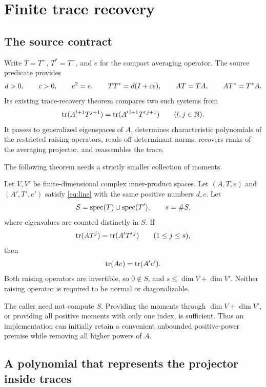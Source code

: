 \section{Finite trace recovery}\label{sec:trace}

\subsection{The source contract}

Write \(T=T^+\), \(T^*=T^-\), and \(e\) for the compact averaging operator.
The source predicate  provides
\begin{equation}\label{eq:line}
 d>0,\qquad c>0,\qquad e^2=e,\qquad
 TT^*=d(I+ce),\qquad AT=TA,\qquad AT^*=T^*A.
\end{equation}
Its existing trace-recovery theorem compares two such systems from
\[
 \operatorname{tr}(A^{l+1}T^{j+1})=\operatorname{tr}(A'^{\,l+1}T'^{\,j+1})
 \qquad(l,j\in\mathbb N).
\]
It passes to generalized eigenspaces of \(A\), determines characteristic polynomials
of the restricted raising operators, reads off determinant norms, recovers ranks of
the averaging projector, and reassembles the trace.

The following theorem needs a strictly smaller collection of moments.

\begin{theorem}\label{thm:finite-trace}
Let \(V,V'\) be finite-dimensional complex inner-product spaces. Let
\((A,T,e)\) and \((A',T',e')\) satisfy \eqref{eq:line} with the same positive
numbers \(d,c\). Let
\[
 S=\operatorname{spec}(T)\cup\operatorname{spec}(T'),\qquad s=\#S,
\]
where eigenvalues are counted distinctly in \(S\). If
\begin{equation}\label{eq:finite-moments}
 \operatorname{tr}(AT^j)=\operatorname{tr}(A'T'^{\,j})\qquad(1\leq j\leq s),
\end{equation}
then
\[
 \operatorname{tr}(Ae)=\operatorname{tr}(A'e').
\]
Both raising operators are invertible, so \(0\notin S\), and
\(s\leq\dim V+\dim V'\). Neither raising operator is required to be normal
or diagonalizable.
\end{theorem}

The caller need not compute \(S\). Providing the moments through
\(\dim V+\dim V'\), or providing all positive moments with only one index,
is sufficient. Thus an implementation can initially retain a convenient
unbounded positive-power premise while removing all higher powers of \(A\).

\subsection{A polynomial that represents the projector inside traces}

